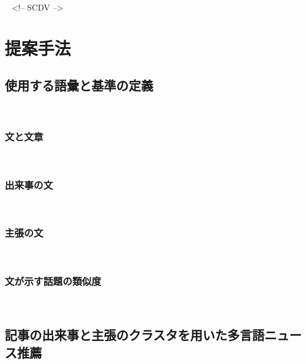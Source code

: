 \documentclass[12pt,a4j]{jreport}
\begin{document}
~%
 <!-- SCDV -->


\chapter{提案手法}


\section{使用する語彙と基準の定義}
~

\subsection{文と文章}
~

\subsection{出来事の文}
~

\subsection{主張の文}
~

\subsection{文が示す話題の類似度}
~

\section{記事の出来事と主張のクラスタを用いた多言語ニュース推薦}
~


\end{document}
